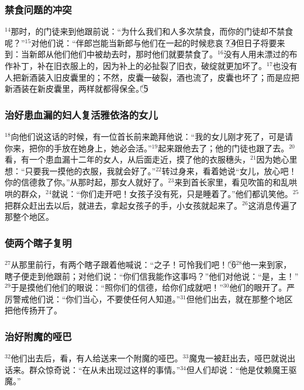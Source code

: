 \subsubsection{禁食问题的冲突}
$^{14}$那时，\UL[若翰]的门徒来到他跟前说：“为什么我们和\UL[法利塞]人多次禁食，而你的门徒却不禁食呢？”$^{15}$\UL[耶稣]对他们说：“伴郎岂能当新郎与他们在一起的时候悲哀？\textcircled{4}但日子将要来到：当新郎从他们他们中被劫去时，那时他们就要禁食了。$^{16}$没有人用未漂过的布作补丁，补在旧衣服上的，因为补上的必扯裂了旧衣，破绽就更加坏了。$^{17}$也没有人把新酒装入旧皮囊里的；不然，皮囊一破裂，酒也流了，皮囊也坏了；而是应把新酒装在新皮囊里，两样就都得保全。”\textcircled{5}


\subsubsection{治好患血漏的妇人复活雅依洛的女儿}
$^{18}$\UL[耶稣]向他们说这话的时候，有一位首长前来跪拜他说：“我的女儿刚才死了，可是请你来，把你的手放在她身上，她必会活。”$^{19}$\UL[耶稣]起来跟他去了；他的门徒也跟了去。$^{20}$看，有一个患血漏十二年的女人，从后面走近，摸了他的衣服穗头，$^{21}$因为她心里想：“只要我一摸他的衣服，我就会好了。”$^{22}$\UL[耶稣]转过身来，看着她说“女儿，放心吧！你的信德救了你。”从那时起，那女人就好了。$^{23}$\UL[耶稣]来到首长家里，看见吹笛的和乱哄哄的群众，$^{24}$就说：“你们走开吧！女孩子没有死，只是睡着了。”他们都讥笑他。$^{25}$把群众赶出去以后，\UL[耶稣]就进去，拿起女孩子的手，小女孩就起来了。$^{26}$这消息传遍了那整个地区。


\subsubsection{使两个瞎子复明}
$^{27}$\UL[耶稣]从那里前行，有两个瞎子跟着他喊说：“\UL[达味]之子！可怜我们吧！”\textcircled{6}$^{28}$他一来到家，瞎子便走到他跟前；\UL[耶稣]对他们说：“你们信我能作这事吗？”他们对他说：“是，主！”$^{29}$于是\UL[耶稣]摸他们他们的眼说：“照你们的信德，给你们成就吧！”$^{30}$他们的眼开了。\UL[耶稣]严厉警戒他们说：“你们当心，不要使任何人知道。”$^{31}$但他们出去，就在那整个地区把他传扬开了。


\subsubsection{治好附魔的哑巴}
$^{32}$他们出去后，看，有人给\UL[耶稣]送来一个附魔的哑巴。$^{33}$魔鬼一被赶出去，哑巴就说出话来。群众惊奇说：“在\UL[以色列]从未出现过这样的事情。”$^{34}$但\UL[法利塞]人们却说：“他是仗赖魔王驱魔。”



